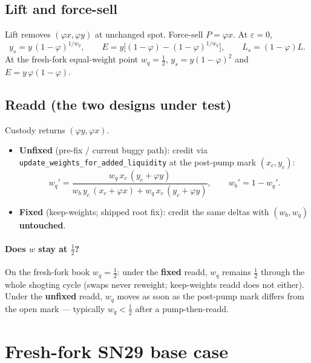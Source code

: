 \documentclass[11pt]{article}
\theoremstyle{definition}
\theoremstyle{remark}
\begin{document}
\subsection{Lift and force-sell}
Lift removes $(\varphi x,\varphi y)$ at unchanged spot. Force-sell
$P=\varphi x$. At $\varepsilon=0$,
\begin{equation}
\label{eq:ys}
y_s=y\,(1-\varphi)^{1/w_q},
\qquad
E=y\bigl[(1-\varphi)-(1-\varphi)^{1/w_q}\bigr],
\qquad
L_s=(1-\varphi)L.
\end{equation}
At the fresh-fork equal-weight point $w_q=\tfrac12$,
$y_s=y(1-\varphi)^2$ and $E=y\,\varphi(1-\varphi)$.

\subsection{Readd (the two designs under test)}
Custody returns $(\varphi y,\varphi x)$.
\begin{itemize}
  \item \textbf{Unfixed} (pre-fix / current buggy path): credit via
    \texttt{update\_weights\_for\_added\_liquidity} at the post-pump
    mark $(x_c,y_c)$:
    \begin{equation}
    \label{eq:reweight}
    w_q'
    =
    \frac{w_q\,x_c\,(y_c+\varphi y)}
         {w_b\,y_c\,(x_c+\varphi x)+w_q\,x_c\,(y_c+\varphi y)},
    \qquad w_b'=1-w_q'.
    \end{equation}
  \item \textbf{Fixed} (keep-weights; shipped root fix): credit the same
    deltas with $(w_b,w_q)$ \textbf{untouched}.
\end{itemize}

\paragraph{Does $w$ stay at $\tfrac12$?}
On the fresh-fork book $w_q=\tfrac12$: under the \textbf{fixed} readd,
$w_q$ remains $\tfrac12$ through the whole shogting cycle (swaps never
reweight; keep-weights readd does not either). Under the
\textbf{unfixed} readd, $w_q$ moves as soon as the post-pump mark differs
from the open mark --- typically $w_q<\tfrac12$ after a pump-then-readd.

\section{Fresh-fork SN29 base case}
\label{sec:fresh}
\end{document}

